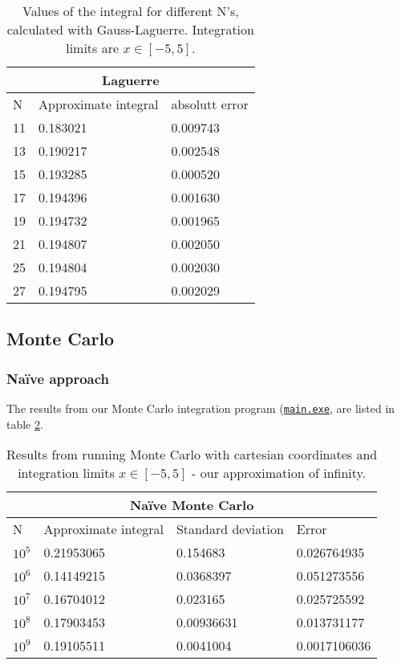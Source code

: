 \documentclass[../main.tex]{subfiles}
\begin{document}
\begin{table}[h!]
\begin{center}
\begin{tabular}{ |p{1cm}|p{4cm}|p{3cm}|}
 \hline
 \multicolumn{3}{|c|}{\textbf{Laguerre}} \\
 \hline
       N   & Approximate integral & absolutt error\\
 \hline
 11 &  0.183021 &  0.009743\\
 13 &  0.190217 &  0.002548\\
 15 &  0.193285 &  0.000520\\
 17 &  0.194396 &  0.001630\\
 19 &  0.194732 &  0.001965\\
 21 &  0.194807 &  0.002050\\
 25 &  0.194804 &  0.002030\\
 27 &  0.194795 &  0.002029\\

 \hline
\end{tabular}
\caption{Values of the integral for different N's, calculated with Gauss-Laguerre. Integration limits are $x\in[-5,5]$.}
\label{tab:res-gaulag}
\end{center}
\end{table}

\FloatBarrier

\subsection{Monte Carlo}
\subsubsection{Naïve approach}
The results from our Monte Carlo integration program (\href{https://github.com/kmaasrud/Project-3/blob/master/code/Monte-Carlo/main.exe}{\texttt{main.exe}}, are listed in table \ref{tab:res-naive}.

\begin{table}[h!]
  \begin{center}
    \begin{tabular}{|p{1cm}|p{3.5cm}|p{3cm}|p{3cm}|}
     \hline
     \multicolumn{4}{|c|}{\textbf{Naïve Monte Carlo}} \\
     \hline
           N   & Approximate integral & Standard deviation & Error\\
     \hline
     $10^5$ &  0.21953065 &  0.154683 & 0.026764935\\
     $10^6$ &  0.14149215 &  0.0368397 & 0.051273556\\
     $10^7$ &  0.16704012 &  0.023165 & 0.025725592\\
     $10^8$ &  0.17903453 &  0.00936631 & 0.013731177\\
     $10^9$ &  0.19105511 &  0.0041004 & 0.0017106036\\

     \hline
    \end{tabular}
    \caption{Results from running Monte Carlo with cartesian coordinates and integration limits $x\in[-5,5]$ - our approximation of infinity.}
    \label{tab:res-naive}
  \end{center}
\end{table}
\end{document}
